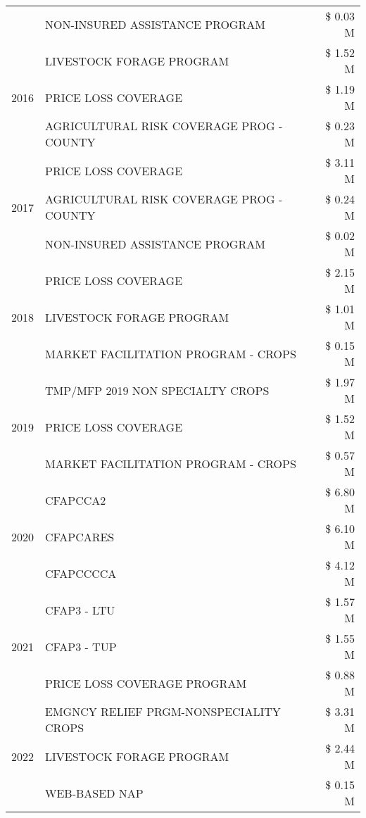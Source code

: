 \begin{tabular}{llr}
 & NON-INSURED ASSISTANCE PROGRAM & \$ 0.03 M \\
\cline{1-3}
\multirow[t]{3}{*}{2016} & LIVESTOCK FORAGE PROGRAM & \$ 1.52 M \\
 & PRICE LOSS COVERAGE & \$ 1.19 M \\
 & AGRICULTURAL RISK COVERAGE PROG - COUNTY & \$ 0.23 M \\
\cline{1-3}
\multirow[t]{3}{*}{2017} & PRICE LOSS COVERAGE & \$ 3.11 M \\
 & AGRICULTURAL RISK COVERAGE PROG - COUNTY & \$ 0.24 M \\
 & NON-INSURED ASSISTANCE PROGRAM & \$ 0.02 M \\
\cline{1-3}
\multirow[t]{3}{*}{2018} & PRICE LOSS COVERAGE & \$ 2.15 M \\
 & LIVESTOCK FORAGE PROGRAM & \$ 1.01 M \\
 & MARKET FACILITATION PROGRAM - CROPS & \$ 0.15 M \\
\cline{1-3}
\multirow[t]{3}{*}{2019} & TMP/MFP 2019 NON SPECIALTY CROPS & \$ 1.97 M \\
 & PRICE LOSS COVERAGE & \$ 1.52 M \\
 & MARKET FACILITATION PROGRAM - CROPS & \$ 0.57 M \\
\cline{1-3}
\multirow[t]{3}{*}{2020} & CFAPCCA2 & \$ 6.80 M \\
 & CFAPCARES & \$ 6.10 M \\
 & CFAPCCCCA & \$ 4.12 M \\
\cline{1-3}
\multirow[t]{3}{*}{2021} & CFAP3 - LTU & \$ 1.57 M \\
 & CFAP3 - TUP & \$ 1.55 M \\
 & PRICE LOSS COVERAGE PROGRAM & \$ 0.88 M \\
\cline{1-3}
\multirow[t]{3}{*}{2022} & EMGNCY RELIEF PRGM-NONSPECIALITY CROPS & \$ 3.31 M \\
 & LIVESTOCK FORAGE PROGRAM & \$ 2.44 M \\
 & WEB-BASED NAP & \$ 0.15 M \\
\cline{1-3}
\bottomrule
\end{tabular}
